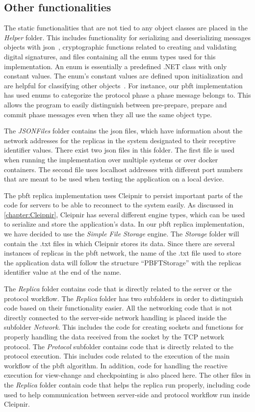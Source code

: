 \subsection{Other functionalities}
The static functionalities that are not tied to any object classes are placed in the \emph{Helper} folder. This includes functionality for serializing and deserializing messages objects with \ac{json}~\cite{WEB:NewJSON}, cryptographic functions related to creating and validating digital signatures, and files containing all the enum types used for this implementation. An enum is essentially a predefined .NET class with only constant values. The enum’s constant values are defined upon initialization and are helpful for classifying other objects~\cite{WEB:Enum}. For instance, our \ac{pbft} implementation has used enums to categorize the protocol phase a phase message belongs to. This allows the program to easily distinguish between pre-prepare, prepare and commit phase messages even when they all use the same object type.

The \emph{JSONFiles} folder contains the \ac{json} files, which have information about the network addresses for the replicas in the system designated to their receptive identifier values. There exist two \ac{json} files in this folder. The first file is used when running the implementation over multiple systems or over docker containers. The second file uses localhost addresses with different port numbers that are meant to be used when testing the application on a local device.

The \ac{pbft} replica implementation uses Cleipnir to persist important parts of the code for servers to be able to reconnect to the system easily. As discussed in \autoref{chapter:Cleipnir}, Cleipnir has several different engine types, which can be used to serialize and store the application’s data. In our \ac{pbft} replica implementation, we have decided to use the \emph{Simple File Storage} engine. The \emph{Storage} folder will contain the .txt files in which Cleipnir stores its data. Since there are several instances of replicas in the \ac{pbft} network, the name of the .txt file used to store the application data will follow the structure “PBFTStorage” with the replicas identifier value at the end of the name.

The \emph{Replica} folder contains code that is directly related to the server or the protocol workflow. The \emph{Replica} folder has two subfolders in order to distinguish code based on their functionality easier. All the networking code that is not directly connected to the server-side network handling is placed inside the subfolder \emph{Network}. This includes the code for creating sockets and functions for properly handling the data received from the socket by the TCP network protocol.
The \emph{Protocol} subfolder contains code that is directly related to the protocol execution. This includes code related to the execution of the main workflow of the \ac{pbft} algorithm. In addition, code for handling the reactive execution for view-change and checkpointing is also placed here.
The other files in the \emph{Replica} folder contain code that helps the replica run properly, including code used to help communication between server-side and protocol workflow run inside Cleipnir.

